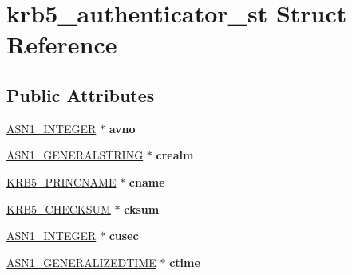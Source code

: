 \hypertarget{structkrb5__authenticator__st}{}\section{krb5\+\_\+authenticator\+\_\+st Struct Reference}
\label{structkrb5__authenticator__st}
\subsection*{Public Attributes}
\begin{DoxyCompactItemize}
\item 
\mbox{\label{structkrb5__authenticator__st_a9ed01e68c50931dd9d7ab5bc02c1201d}} 
\hyperlink{structasn1__string__st}{A\+S\+N1\+\_\+\+I\+N\+T\+E\+G\+ER} $\ast$ {\bfseries avno}
\item 
\mbox{\label{structkrb5__authenticator__st_afe6a1007edb042a4152f9f7c81576568}} 
\hyperlink{structasn1__string__st}{A\+S\+N1\+\_\+\+G\+E\+N\+E\+R\+A\+L\+S\+T\+R\+I\+NG} $\ast$ {\bfseries crealm}
\item 
\mbox{\label{structkrb5__authenticator__st_a97834129a3f43febc53ebd5335de32b7}} 
\hyperlink{structkrb5__princname__st}{K\+R\+B5\+\_\+\+P\+R\+I\+N\+C\+N\+A\+ME} $\ast$ {\bfseries cname}
\item 
\mbox{\label{structkrb5__authenticator__st_ac34bce7526107466b7462957744ddee6}} 
\hyperlink{structkrb5__checksum__st}{K\+R\+B5\+\_\+\+C\+H\+E\+C\+K\+S\+UM} $\ast$ {\bfseries cksum}
\item 
\mbox{\label{structkrb5__authenticator__st_a0338e47f6edaf74442f46dc6ad8fbfcb}} 
\hyperlink{structasn1__string__st}{A\+S\+N1\+\_\+\+I\+N\+T\+E\+G\+ER} $\ast$ {\bfseries cusec}
\item 
\mbox{\label{structkrb5__authenticator__st_acdcdd96312d76a5cb2398768e5ed0e69}} 
\hyperlink{structasn1__string__st}{A\+S\+N1\+\_\+\+G\+E\+N\+E\+R\+A\+L\+I\+Z\+E\+D\+T\+I\+ME} $\ast$ {\bfseries ctime}
\item 
\mbox{\label{structkrb5__authenticator__st_a03ed3e43b6e55c3109d5531ee904b8bf}} 

\end{DoxyCompactItemize}
